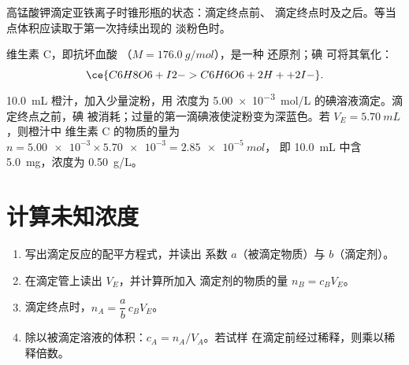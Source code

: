 \begin{omfigure}

{\small 高锰酸钾滴定亚铁离子时锥形瓶的状态：滴定终点前、
滴定终点时及之后。等当点体积应读取于第一次持续出现的
淡粉色时。}
\end{omfigure}

\begin{example}[维生素 C 与碘]\label{ex:g11:titration:vitamin-c}
维生素 C，即抗坏血酸 （$M = \qty{176.0}{g/mol}$），是一种
还原剂；碘  可将其氧化：
\[
  \ce{C6H8O6 + I2 -> C6H6O6 + 2H+ + 2I-} .
\]
\qty{10.0}{mL} 橙汁，加入少量淀粉，用
浓度为 \qty{5.00e-3}{mol/L} 的碘溶液滴定。滴定终点之前，碘
被消耗；过量的第一滴碘液使淀粉变为深蓝色。若
$V_E = \qty{5.70}{mL}$，则橙汁中
维生素 C 的物质的量为 $n = \num{5.00e-3} \times \num{5.70e-3} = \qty{2.85e-5}{mol}$，
即 \qty{10.0}{mL} 中含 \qty{5.0}{mg}，浓度为 \qty{0.50}{g/L}。
\end{example}

\section{计算未知浓度}

\begin{method}[由滴定计算浓度]\label{met:g11:titration:computing}
\begin{enumerate}
  \item 写出滴定反应的配平方程式，并读出
        系数 $a$（被滴定物质）与 $b$（滴定剂）。
  \item 在滴定管上读出 $V_E$，并计算所加入
        滴定剂的物质的量 $n_B = c_B V_E$。
  \item 滴定终点时，$n_A = \dfrac{a}{b}\, c_B V_E$。
  \item 除以被滴定溶液的体积：$c_A = n_A / V_A$。若试样
        在滴定前经过稀释，则乘以稀释倍数。
\end{enumerate}
\end{method}

